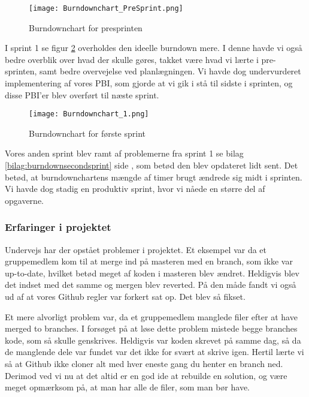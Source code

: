 \begin{figure}[h]
    \caption{Burndownchart for presprinten}
    \centering
        \texttt{[image: Burndownchart\_PreSprint.png]}
    \label{fig:burndownpresprint}
\end{figure}

I sprint 1 se figur \ref{fig:burndownfirstsprint} overholdes den ideelle burndown mere.
I denne havde vi også bedre overblik over hvad der skulle gøres, takket være hvad vi lærte i pre-sprinten, samt bedre overvejelse ved planlægningen.
Vi havde dog undervurderet implementering af vores PBI, som gjorde at vi gik i stå til sidste i sprinten, og disse PBI'er blev overført til næste sprint.

\begin{figure}[h]
    \caption{Burndownchart for første sprint}
    \centering
        \texttt{[image: Burndownchart\_1.png]}
    \label{fig:burndownfirstsprint}
\end{figure}

Vores anden sprint blev ramt af problemerne fra sprint 1 se bilag \ref{bilag:burndownsecondsprint} side \pageref{bilag:burndownsecondsprint}, som betød den blev opdateret lidt sent.
Det betød, at burndownchartens mængde af timer brugt ændrede sig midt i sprinten.
Vi havde dog stadig en produktiv sprint, hvor vi nåede en større del af opgaverne.



\subsubsection{Erfaringer i projektet}

Undervejs har der opstået problemer i projektet.
Et eksempel var da et gruppemedlem kom til at merge ind på masteren med en branch, som ikke var up-to-date, hvilket betød meget af koden i masteren blev ændret.
Heldigvis blev det indset med det samme og mergen blev reverted.
På den måde fandt vi også ud af at vores Github regler var forkert sat op.
Det blev så fikset.

Et mere alvorligt problem var, da et gruppemedlem manglede filer efter at have merged to branches.
I forsøget på at løse dette problem mistede begge branches kode, som så skulle genskrives.
Heldigvis var koden skrevet på samme dag, så da de manglende dele var fundet var det ikke for svært at skrive igen.
Hertil lærte vi så at Github ikke cloner alt med hver eneste gang du henter en branch ned.
Derimod ved vi nu at det altid er en god ide at rebuilde en solution, og være meget opmærksom på, at man har alle de filer, som man bør have.